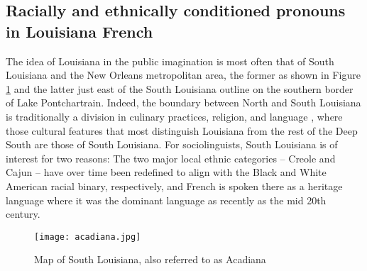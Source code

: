     \subsection{Racially and ethnically conditioned pronouns in Louisiana French} %




  The idea of Louisiana in the public imagination is most often that of South Louisiana and the New Orleans metropolitan area, the former as shown in Figure \ref{fig:south_la} and the latter just east of the South Louisiana outline on the southern border of Lake Pontchartrain.
  Indeed, the boundary between North and South Louisiana is traditionally a division in culinary practices, religion, and language \parencite[p.~309]{trepanier_french_1988}, where those cultural features that most distinguish Louisiana from the rest of the Deep South are those of South Louisiana.
  For sociolinguists, South Louisiana is of interest for two reasons: The two major local ethnic categories -- Creole and Cajun -- have over time been redefined to align with the Black and White American racial binary, respectively, and French is spoken there as a heritage language where it was the dominant language as recently as the mid 20th century.

  \begin{figure}[tbhp]
    \centering
    \caption{Map of South Louisiana, also referred to as Acadiana}
    \label{fig:south_la}
    \texttt{[image: acadiana.jpg]}
  \end{figure}

